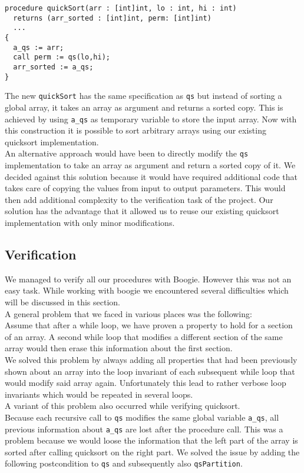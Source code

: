 \begin{verbatim}
procedure quickSort(arr : [int]int, lo : int, hi : int) 
  returns (arr_sorted : [int]int, perm: [int]int) 
  ...
{
  a_qs := arr;
  call perm := qs(lo,hi);
  arr_sorted := a_qs;
}
\end{verbatim}

The new \texttt{quickSort} has the same specification as \texttt{qs} but instead of sorting a global array,
it takes an array as argument and returns a sorted copy. This is achieved by using \texttt{a\_qs} as temporary 
variable to store the input array. Now with this construction it is possible to sort arbitrary arrays using
our existing quicksort implementation.\\

An alternative approach would have been to directly modify the \texttt{qs} implementation to take an array as argument
and return a sorted copy of it. We decided against this solution because it would have required additional code that
takes care of copying the values from input to output parameters. This would then add additional complexity 
to the verification task of the project. Our solution has the advantage that it allowed us to reuse our existing quicksort
implementation with only minor modifications.


\subsection{Verification}

We managed to verify all our procedures with Boogie. However this was not an easy task. While working 
with boogie we encountered several difficulties which will be discussed in this section.\\

A general problem that we faced in various places was the following:\\
Assume that after a while loop, we have proven a property to hold for a section of an array. A second while loop that modifies a different section of the same array
would then erase this information about the first section.\\
We solved this problem by always adding all properties that
had been previously shown about an array into the loop invariant of each subsequent while loop that would modify 
said array again. Unfortunately this lead to rather verbose loop invariants which would be repeated in several loops.\\

A variant of this problem also occurred while verifying quicksort.\\
Because each recursive call to \texttt{qs} modifies the same global variable \texttt{a\_qs}, all previous information about \texttt{a\_qs} 
are lost after the procedure call. This was a problem because we would loose the information that the left
part of the array is sorted after calling quicksort on the right part. 
We solved the issue by adding the following postcondition to \texttt{qs} and subsequently also \texttt{qsPartition}.

